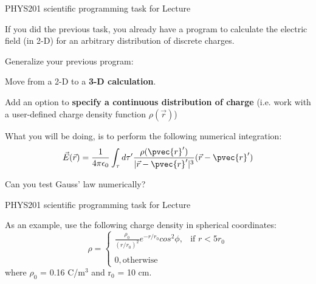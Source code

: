 {
\programmingslide

%
%
%

\begin{frame}{PHYS201 scientific programming task for Lecture \thislecture}

{\small

If you did the previous task, you already have a program to calculate the
electric field (in 2-D) for an arbitrary distribution of discrete charges.\\
\vspace{0.2cm}

Generalize your previous program:
\begin{itemize}
{
  \item Move from a 2-D to a {\bf 3-D calculation}.
  \item Add an option to {\bf specify a continuous distribution of charge}
        (i.e. work with a user-defined charge density function $\rho(\vec{r})$)
}
\end{itemize}

\vspace{0.2cm}
What you will be doing, is to perform the following numerical integration:
\begin{equation*}
   \vec{E}(\vec{r}) = \frac{1}{4\pi\epsilon_0} \int_{\tau}
      d\tau^{\prime} \frac{\rho({\pvec{r}'})}{|\vec{r}-\pvec{r}'|^{3}} (\vec{r}-\pvec{r}')
\end{equation*}

\vspace{0.3cm}

Can you test Gauss' law numerically?

}
\end{frame}

%
%
%

\begin{frame}{PHYS201 scientific programming task for Lecture \thislecture}

{\small

As an example, use the following charge density in spherical coordinates:
\begin{equation*}
   \rho =
     \begin{cases}
       \frac{\rho_0}{(r/r_0)^2} e^{-r/r_0} cos^2\phi, & \text{if $r < 5 r_0$} \\
       & \\
       0, \text{otherwise}
     \end{cases}
\end{equation*}
where $\rho_0$ = 0.16 C/m$^{3}$ and r$_0$ = 10 cm.\\
%
%

}
\end{frame}}
